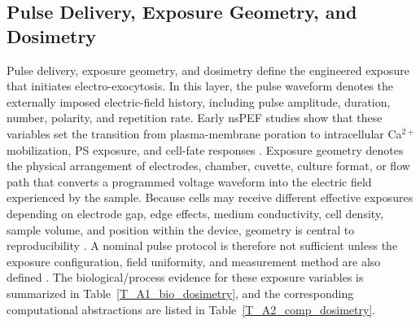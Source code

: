 \documentclass[Afour,sagev,times]{sagej}
\begin{document}
\subsection*{Pulse Delivery, Exposure Geometry, and Dosimetry}

Pulse delivery, exposure geometry, and dosimetry define the engineered exposure that initiates electro-exocytosis. In this layer, the pulse waveform denotes the externally imposed electric-field history, including pulse amplitude, duration, number, polarity, and repetition rate. Early nsPEF studies show that these variables set the transition from plasma-membrane poration to intracellular Ca$^{2+}$ mobilization, PS exposure, and cell-fate responses \cite{beebe2003nanosecond,vernier2003calcium,pakhomov2007membrane,semenov2013primary}. Exposure geometry denotes the physical arrangement of electrodes, chamber, cuvette, culture format, or flow path that converts a programmed voltage waveform into the electric field experienced by the sample. Because cells may receive different effective exposures depending on electrode gap, edge effects, medium conductivity, cell density, sample volume, and position within the device, geometry is central to reproducibility \cite{joshi2000electroporation,kotnik2019membrane,baker2024numerical}. A nominal pulse protocol is therefore not sufficient unless the exposure configuration, field uniformity, and measurement method are also defined \cite{rems2013cell,leveque2017measurement}. The biological/process evidence for these exposure variables is summarized in Table~\ref{T_A1_bio_dosimetry}, and the corresponding computational abstractions are listed in Table~\ref{T_A2_comp_dosimetry}.
\end{document}
